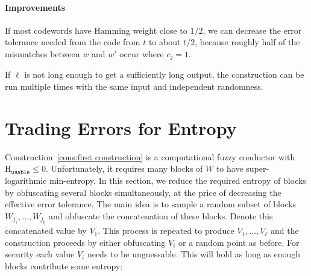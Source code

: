 \documentclass[11pt]{article}
\newcommand{\consref}[1]{\mbox{Construction~\ref{#1}}}
\newcommand{\Huse}{\mathrm{H}_{\mathtt{usable}}}
\newcommand{\authnote}[2]{{\textcolor{red}{\textsf{#1 notes: }\textcolor{blue}{ #2}}\marginpar{\textcolor{red}{\textbf{!!!!!}}}}}
\newcommand{\authnote}[2]{}
\newcommand{\lnote}[1]{{\authnote{Leo}{#1}}}
\begin{document}
\paragraph{Improvements}  If most codewords have Hamming weight close to $1/2$, we can decrease the error tolerance needed from the code from $t$ to  about $t/2$, because roughly half of the mismatches between $w$ and $w'$ occur where $c_j =1$.

If $\ell$ is not long enough to get a sufficiently long output, the construction can be run multiple times with the same input and independent randomness.



\section{Trading Errors for Entropy}
\label{sec:sampling}
\consref{cons:first construction} is a computational fuzzy conductor with $\Huse\le 0$.  Unfortunately, it requires many blocks of $W$ to have super-logarithmic min-entropy.  In this section, we reduce the required entropy of blocks by obfuscating several blocks simultaneously, at the price of  decreasing the effective error tolerance.
The main idea is to sample a random subset of blocks $W_{j_1},..., W_{j_\eta}$ and obfuscate the concatenation of these blocks.  Denote this concatenated value by $V_1$.  This process is repeated to produce $V_1,..., V_\ell$ and the construction proceeds by either obfuscating $V_i$ or a random point as before. For security each value $V_i$ needs to be unguessable.  This will hold as long as enough blocks contribute some entropy:
\end{document}
